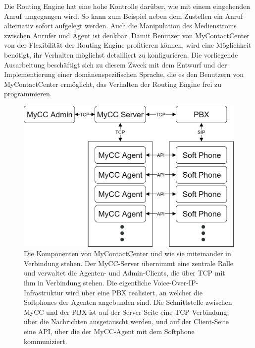 \newline
Die Routing Engine hat eine hohe Kontrolle darüber, wie mit einem eingehenden Anruf umgegangen wird. So kann zum Beispiel neben dem Zustellen ein Anruf alternativ sofort aufgelegt werden. Auch die Manipulation des Medienstroms zwischen Anrufer und Agent ist denkbar. Damit Benutzer von MyContactCenter von der Flexibilität der Routing Engine profitieren können, wird eine Möglichkeit benötigt, ihr Verhalten möglichst detailliert zu konfigurieren. Die vorliegende Ausarbeitung beschäftigt sich zu diesem Zweck mit dem Entwurf und der Implementierung einer domänenspezifischen Sprache, die es den Benutzern von MyContactCenter ermöglicht, das Verhalten der Routing Engine frei zu programmieren.   

\begin{figure} %
	\centering
		\includegraphics[width=\textwidth]{img/MyCCStructure.png}
	\caption[Komponententstruktur von MyContactCenter]{Die Komponenten von MyContactCenter und wie sie miteinander in Verbindung stehen. Der MyCC-Server übernimmt eine zentrale Rolle und verwaltet die Agenten- und Admin-Clients, die über TCP mit ihm in Verbindung stehen. Die eigentliche Voice-Over-IP-Infrastruktur wird über eine PBX realisiert, an welcher die Softphones der Agenten angebunden sind. Die Schnittstelle zwischen MyCC und der PBX ist auf der Server-Seite eine TCP-Verbindung, über die Nachrichten ausgetauscht werden, und auf der Client-Seite eine API, über die der MyCC-Agent mit dem Softphone kommuniziert.}
	\label{fig:MyCCStructure}
\end{figure}

